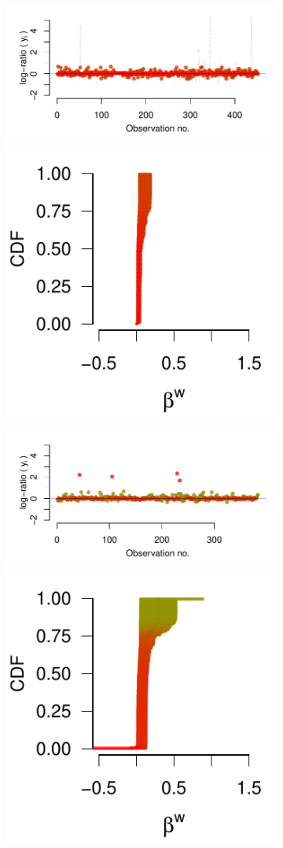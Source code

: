 \documentclass[9pt,a4paper,twocolumn,lineno]{article}
\begin{document}
\begin{figure}
	\centering
	\begin{subfigure}{.49\linewidth}
		{\includegraphics[width=.65\linewidth]{threads/thread_history_55_1}	\includegraphics[width=.33\linewidth]{betas/beta_history_55_1}	}

		{\includegraphics[width=.65\linewidth]{threads/thread_history_55_3}	\includegraphics[width=.33\linewidth]{betas/beta_history_55_3}}
		

\end{subfigure}
\end{figure}
\end{document}
